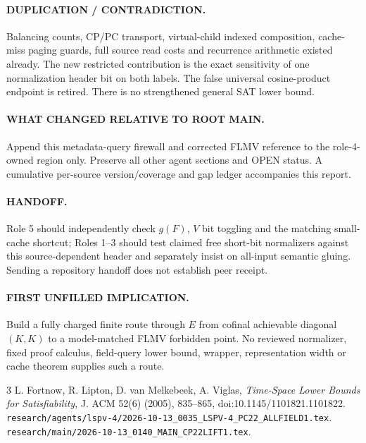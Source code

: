 \documentclass[11pt]{article}
\begin{document}
\paragraph{DUPLICATION / CONTRADICTION.} Balancing counts, CP/PC transport, virtual-child indexed composition, cache-miss paging guards, full source read costs and recurrence arithmetic existed already. The new restricted contribution is the exact sensitivity of one normalization header bit on both labels. The false universal cosine-product endpoint is retired. There is no strengthened general SAT lower bound.
\paragraph{WHAT CHANGED RELATIVE TO ROOT MAIN.} Append this metadata-query firewall and corrected FLMV reference to the role-4-owned region only. Preserve all other agent sections and OPEN status. A cumulative per-source version/coverage and gap ledger accompanies this report.
\paragraph{HANDOFF.} Role 5 should independently check $g(F)$, $V$ bit toggling and the matching small-cache shortcut; Roles 1--3 should test claimed free short-bit normalizers against this source-dependent header and separately insist on all-input semantic gluing. Sending a repository handoff does not establish peer receipt.
\paragraph{FIRST UNFILLED IMPLICATION.} Build a fully charged finite route through $E$ from cofinal achievable diagonal $(K,K)$ to a model-matched FLMV forbidden point. No reviewed normalizer, fixed proof calculus, field-query lower bound, wrapper, representation width or cache theorem supplies such a route.
\begin{thebibliography}{3}\small
{} L. Fortnow, R. Lipton, D. van Melkebeek, A. Viglas, \emph{Time-Space Lower Bounds for Satisfiability}, J. ACM 52(6) (2005), 835--865, doi:10.1145/1101821.1101822.
 \texttt{research/agents/lspv-4/2026-10-13\_0035\_LSPV-4\_PC22\_ALLFIELD1.tex}.
 \texttt{research/main/2026-10-13\_0140\_MAIN\_CP22LIFT1.tex}.
\end{thebibliography}
\end{document}
